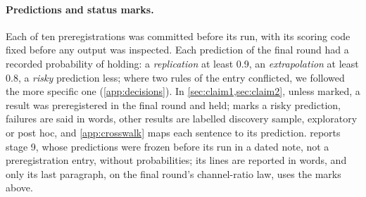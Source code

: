 \paragraph{Predictions and status marks.}
Each of ten preregistrations was committed before its run, with its scoring code fixed before any output was inspected. Each prediction of the final round had a recorded probability of holding: a \emph{replication} at least 0.9, an \emph{extrapolation} at least 0.8, a \emph{risky} prediction less; where two rules of the entry conflicted, we followed the more specific one (\cref{app:decisions}). In \cref{sec:claim1,sec:claim2}, unless marked, a result was preregistered in the final round and held; \rsk{} marks a risky prediction, failures are said in words, other results are labelled discovery sample, exploratory or post hoc, and \cref{app:crosswalk} maps each sentence to its prediction.  reports stage 9, whose predictions were frozen before its run in a dated note, not a preregistration entry, without probabilities; its lines are reported in words, and only its last paragraph, on the final round's channel-ratio law, uses the marks above.
